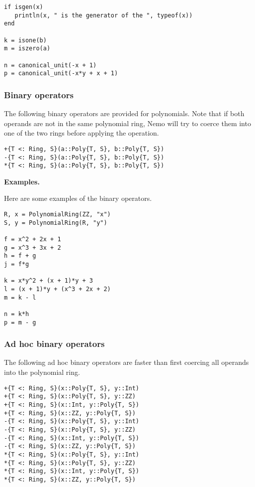 \documentclass[a4paper,10pt]{article}
\begin{document}
{{{\begin{lstlisting}
if isgen(x)
   println(x, " is the generator of the ", typeof(x))
end

k = isone(b)
m = iszero(a)

n = canonical_unit(-x + 1)
p = canonical_unit(-x*y + x + 1)
\end{lstlisting}

\subsubsection{Binary operators}

The following binary operators are provided for polynomials. Note that
if both operands are not in the same polynomial ring, Nemo will try to
coerce them into one of the two rings before applying the operation.

\begin{lstlisting}
+{T <: Ring, S}(a::Poly{T, S}, b::Poly{T, S})
-{T <: Ring, S}(a::Poly{T, S}, b::Poly{T, S})
*{T <: Ring, S}(a::Poly{T, S}, b::Poly{T, S})
\end{lstlisting}

\textbf{Examples.}

Here are some examples of the binary operators.

\begin{lstlisting}
R, x = PolynomialRing(ZZ, "x")
S, y = PolynomialRing(R, "y")

f = x^2 + 2x + 1
g = x^3 + 3x + 2
h = f + g
j = f*g

k = x*y^2 + (x + 1)*y + 3
l = (x + 1)*y + (x^3 + 2x + 2)
m = k - l

n = k*h
p = m - g
\end{lstlisting}

\subsubsection{Ad hoc binary operators}

The following ad hoc binary operators are faster than first coercing all
operands into the polynomial ring.

\begin{lstlisting}
+{T <: Ring, S}(x::Poly{T, S}, y::Int)
+{T <: Ring, S}(x::Poly{T, S}, y::ZZ)
+{T <: Ring, S}(x::Int, y::Poly{T, S})
+{T <: Ring, S}(x::ZZ, y::Poly{T, S})
-{T <: Ring, S}(x::Poly{T, S}, y::Int)
-{T <: Ring, S}(x::Poly{T, S}, y::ZZ)
-{T <: Ring, S}(x::Int, y::Poly{T, S})
-{T <: Ring, S}(x::ZZ, y::Poly{T, S})
*{T <: Ring, S}(x::Poly{T, S}, y::Int)
*{T <: Ring, S}(x::Poly{T, S}, y::ZZ)
*{T <: Ring, S}(x::Int, y::Poly{T, S})
*{T <: Ring, S}(x::ZZ, y::Poly{T, S})
\end{lstlisting}

}}}
\end{document}
